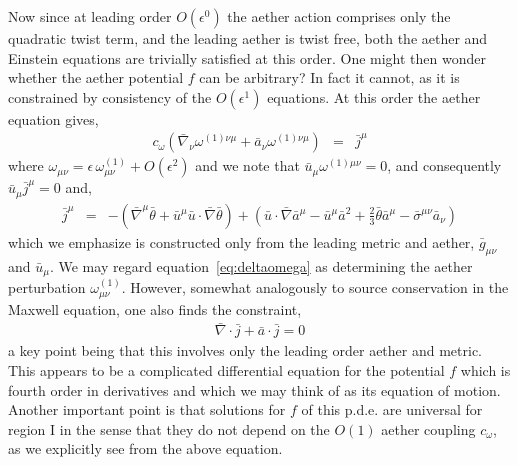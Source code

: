 \documentclass[12pt]{article}
\numberwithin{equation}{section}
\begin{document}
Now since at leading order $O(\epsilon^0)$ the aether action comprises only the quadratic twist term, and the leading aether is twist free, both the aether and Einstein equations are trivially satisfied at this order. One might then wonder whether the aether potential $f$ can be arbitrary? In fact it cannot, as it is constrained by consistency of the $O(\epsilon^1)$ equations. At this order the aether equation gives,
\begin{eqnarray}
\label{eq:deltaomega}
c_\omega \left( \bar{\nabla}_\nu \omega^{(1)\nu\mu} +  \bar{a}_\nu \omega^{(1)\nu\mu}   \right) & = & \bar{j}^\mu
\end{eqnarray}
where $\omega_{\mu\nu} = \epsilon\,  \omega^{(1)}_{\mu\nu} + O(\epsilon^2)$ and we note that $\bar{u}_\mu  \omega^{(1)\mu\nu} = 0$, and consequently $\bar{u}_\mu \bar{j}^\mu = 0$ and,
\begin{eqnarray}
\label{eq:fEqOneParam}
 \bar{j}^\mu & = &
 -
\left( \bar{\nabla}^\mu \bar{\theta} +  \bar{u}^\mu \bar{u} \cdot \bar{\nabla} \bar{\theta} \right) +  \left( \bar{u} \cdot \bar{\nabla} \bar{a}^\mu - \bar{u}^\mu \bar{a}^2 + \frac{2}{3} \bar{\theta} \bar{a}^\mu  -  \bar{\sigma}^{\mu\nu} \bar{a}_\nu  \right)   
\end{eqnarray}
which we emphasize is constructed only from the leading metric and aether, $\bar{g}_{\mu\nu}$ and $\bar{u}_\mu$.
We may regard equation~\eqref{eq:deltaomega} as determining the aether perturbation $\omega^{(1)}_{\mu\nu}$. However, somewhat analogously to source conservation in the Maxwell equation, one also finds the constraint,
\begin{eqnarray}
\label{eq:aetherRegion1}
 \bar{\nabla} \cdot \bar{j} + \bar{a} \cdot \bar{j} = 0 
\end{eqnarray}
a key point being that this involves only the leading order aether and metric.
This appears to be a complicated differential equation for the potential $f$ which is fourth order in derivatives
and which we may think of as its equation of motion.
Another important point is that  solutions for $f$ of this p.d.e. are universal for region I in the sense that they do not depend on the $O(1)$ aether coupling $c_\omega$, as we explicitly see from the above equation.  
\end{document}
